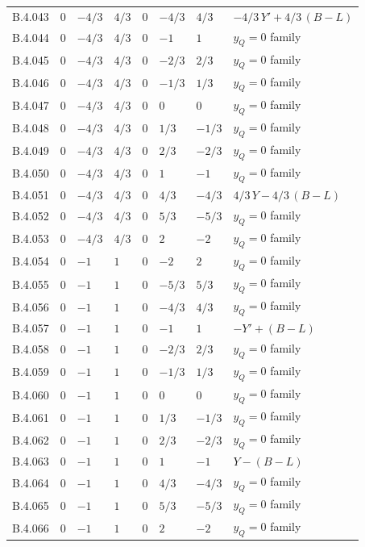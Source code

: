 {\begin{longtable}{@{}lllllll>{\raggedright\arraybackslash}p{5.6cm}@{}}
B.4.043 & $0$ & $-4/3$ & $4/3$ & $0$ & $-4/3$ & $4/3$ & $-4/3\,Y'+4/3\,(B{-}L)$ \\
B.4.044 & $0$ & $-4/3$ & $4/3$ & $0$ & $-1$ & $1$ & $y_Q=0$ family \\
B.4.045 & $0$ & $-4/3$ & $4/3$ & $0$ & $-2/3$ & $2/3$ & $y_Q=0$ family \\
B.4.046 & $0$ & $-4/3$ & $4/3$ & $0$ & $-1/3$ & $1/3$ & $y_Q=0$ family \\
B.4.047 & $0$ & $-4/3$ & $4/3$ & $0$ & $0$ & $0$ & $y_Q=0$ family \\
B.4.048 & $0$ & $-4/3$ & $4/3$ & $0$ & $1/3$ & $-1/3$ & $y_Q=0$ family \\
B.4.049 & $0$ & $-4/3$ & $4/3$ & $0$ & $2/3$ & $-2/3$ & $y_Q=0$ family \\
B.4.050 & $0$ & $-4/3$ & $4/3$ & $0$ & $1$ & $-1$ & $y_Q=0$ family \\
B.4.051 & $0$ & $-4/3$ & $4/3$ & $0$ & $4/3$ & $-4/3$ & $4/3\,Y-4/3\,(B{-}L)$ \\
B.4.052 & $0$ & $-4/3$ & $4/3$ & $0$ & $5/3$ & $-5/3$ & $y_Q=0$ family \\
B.4.053 & $0$ & $-4/3$ & $4/3$ & $0$ & $2$ & $-2$ & $y_Q=0$ family \\
B.4.054 & $0$ & $-1$ & $1$ & $0$ & $-2$ & $2$ & $y_Q=0$ family \\
B.4.055 & $0$ & $-1$ & $1$ & $0$ & $-5/3$ & $5/3$ & $y_Q=0$ family \\
B.4.056 & $0$ & $-1$ & $1$ & $0$ & $-4/3$ & $4/3$ & $y_Q=0$ family \\
B.4.057 & $0$ & $-1$ & $1$ & $0$ & $-1$ & $1$ & $-Y'+(B{-}L)$ \\
B.4.058 & $0$ & $-1$ & $1$ & $0$ & $-2/3$ & $2/3$ & $y_Q=0$ family \\
B.4.059 & $0$ & $-1$ & $1$ & $0$ & $-1/3$ & $1/3$ & $y_Q=0$ family \\
B.4.060 & $0$ & $-1$ & $1$ & $0$ & $0$ & $0$ & $y_Q=0$ family \\
B.4.061 & $0$ & $-1$ & $1$ & $0$ & $1/3$ & $-1/3$ & $y_Q=0$ family \\
B.4.062 & $0$ & $-1$ & $1$ & $0$ & $2/3$ & $-2/3$ & $y_Q=0$ family \\
B.4.063 & $0$ & $-1$ & $1$ & $0$ & $1$ & $-1$ & $Y-(B{-}L)$ \\
B.4.064 & $0$ & $-1$ & $1$ & $0$ & $4/3$ & $-4/3$ & $y_Q=0$ family \\
B.4.065 & $0$ & $-1$ & $1$ & $0$ & $5/3$ & $-5/3$ & $y_Q=0$ family \\
B.4.066 & $0$ & $-1$ & $1$ & $0$ & $2$ & $-2$ & $y_Q=0$ family \\

\end{longtable}}
